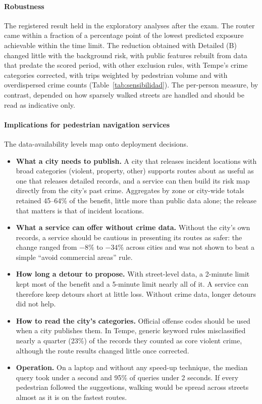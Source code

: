 \documentclass[preprint,12pt,authoryear]{elsarticle}
\begin{document}
\paragraph{Robustness} The registered result held in the exploratory analyses after the exam. The router came within a fraction of a percentage point of the lowest predicted exposure achievable within the time limit. The reduction obtained with Detailed (B) changed little with the background risk, with public features rebuilt from data that predate the scored period, with other exclusion rules, with Tempe's crime categories corrected, with trips weighted by pedestrian volume and with overdispersed crime counts (Table~\ref{tab:sensibilidad}). The per-person measure, by contrast, depended on how sparsely walked streets are handled and should be read as indicative only.

\paragraph{Implications for pedestrian navigation services} The data-availability levels map onto deployment decisions.
\begin{itemize}
  \item \textbf{What a city needs to publish.} A city that releases incident locations with broad categories (violent, property, other) supports routes about as useful as one that releases detailed records, and a service can then build its risk map directly from the city's past crime. Aggregates by zone or city-wide totals retained 45--64\% of the benefit, little more than public data alone; the release that matters is that of incident locations.
  \item \textbf{What a service can offer without crime data.} Without the city's own records, a service should be cautious in presenting its routes as safer: the change ranged from $-8\%$ to $-34\%$ across cities and was not shown to beat a simple ``avoid commercial areas'' rule.
  \item \textbf{How long a detour to propose.} With street-level data, a 2-minute limit kept most of the benefit and a 5-minute limit nearly all of it. A service can therefore keep detours short at little loss. Without crime data, longer detours did not help.
  \item \textbf{How to read the city's categories.} Official offense codes should be used when a city publishes them. In Tempe, generic keyword rules misclassified nearly a quarter (23\%) of the records they counted as core violent crime, although the route results changed little once corrected.
  \item \textbf{Operation.} On a laptop and without any speed-up technique, the median query took under a second and 95\% of queries under 2 seconds. If every pedestrian followed the suggestions, walking would be spread across streets almost as it is on the fastest routes.
\end{itemize}
\end{document}
